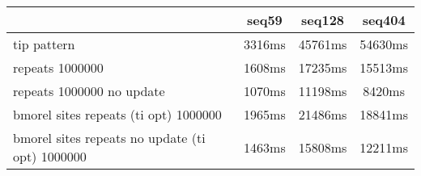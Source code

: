 \begin{tabular}{|l|c|c|c|}
\hline
 & seq59 & seq128 & seq404  \\
\hline
tip pattern &  3316ms &  45761ms &  54630ms\\
\hline
repeats 1000000 &  1608ms &  17235ms &  15513ms\\
\hline
repeats 1000000 no update &  1070ms &  11198ms &  8420ms\\
\hline
bmorel sites repeats (ti opt) 1000000 &  1965ms &  21486ms &  18841ms\\
\hline
bmorel sites repeats no update (ti opt) 1000000 &  1463ms &  15808ms &  12211ms\\
\hline
\end{tabular}

